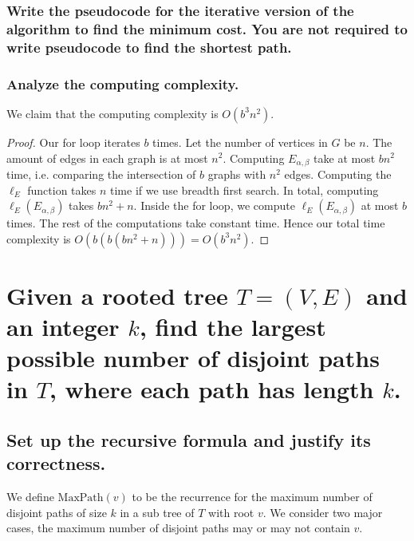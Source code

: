 \documentclass[11pt]{scrartcl}
\newcommand{\maxp}{\text{MaxPath}}
\begin{document}
\subsubsection{
	Write the pseudocode for the iterative version of the algorithm to find the minimum
	cost. You are not required to write pseudocode to find the shortest path.
}
\begin{algorithm}
\end{algorithm}



\subsubsection{
	Analyze the computing complexity.
}
We claim that the computing complexity is $O(b^3n^2)$.
\begin{proof}
	Our for loop iterates $b$ times.
	Let the number of vertices in $G$ be $n$. The amount of edges 
	in each graph is at most $n^2$.
	Computing $E_{\alpha,\beta}$ take at most $bn^2$ time, i.e. comparing the intersection
	of $b$ graphs with $n^2$ edges. Computing the $\ell_E$ function takes $n$ time if we 
	use breadth first search. In total, computing $\ell_E(E_{\alpha,\beta})$ takes
	$bn^2 + n$. Inside the for loop, we compute $\ell_E(E_{\alpha,\beta})$ at most $b$ times.
	The rest of the computations take constant time. Hence our total time complexity is 
	$O(b(b(bn^2 + n))) = O(b^3n^2)$.
\end{proof}


\section{
  Given a	rooted tree $T = (V, E)$ and an integer $k$, find the largest possible
  number of disjoint paths in $T$, where each path has length $k$.
 }
\subsection{
	Set up the recursive formula and justify its correctness.
}
We define $\maxp(v)$ to be the recurrence for the maximum number of disjoint paths of size $k$ in a sub tree
of $T$ with root $v$. We consider two major cases, the maximum number of disjoint paths may or
may not contain $v$.
\end{document}
